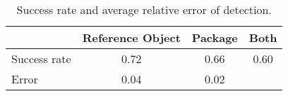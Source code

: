 \begin{table}%
\centering
\begin{tabular}{@{} l *3c @{}}
\toprule
 & {Reference Object}  & {Package}  & {Both}  \\ 
\midrule
Success rate & 0.72 & 0.66 & 0.60 \\ 
Error & 0.04 & 0.02 & \\
\bottomrule
 \end{tabular}
 \caption{Success rate and average relative error of detection.}
\label{table:detection_overall}
\end{table}